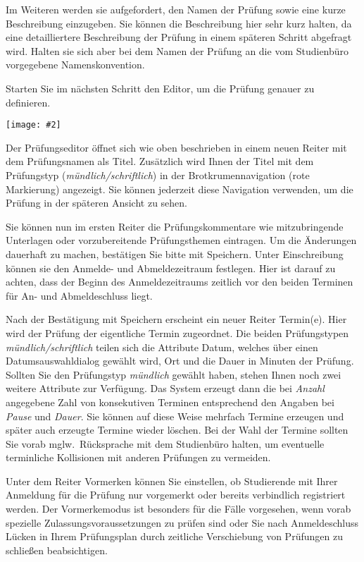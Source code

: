 \documentclass[a4paper,11pt]{article}
\newcommand{\bild}[2]{
    \begin{center}\texttt{[image: \#2]}\end{center}
}
\newcommand{\knopf}[1]{{\sc #1}}
\begin{document}
Im Weiteren werden sie aufgefordert, den Namen der Prüfung sowie eine kurze
Beschreibung einzugeben. Sie können die Beschreibung hier sehr kurz halten, da
eine detailliertere Beschreibung der Prüfung in einem späteren Schritt
abgefragt wird. Halten sie sich aber bei dem Namen der Prüfung an die vom
Studienbüro vorgegebene Namenskonvention. 

Starten Sie im nächsten Schritt den Editor, um die Prüfung genauer zu
definieren.

\bild{1}{Pruefung-Erzeugen-Editor}

Der Prüfungseditor öffnet sich wie oben beschrieben in einem neuen Reiter mit
dem Prüfungsnamen als Titel. Zusätzlich wird Ihnen der Titel mit dem Prüfungstyp ({\em mündlich/schriftlich}) in der \knopf{Brotkrumennavigation} (rote Markierung) angezeigt. Sie können jederzeit diese \knopf{Navigation} verwenden, um die Prüfung in der späteren Ansicht zu sehen. 

Sie können nun im ersten Reiter die Prüfungskommentare wie mitzubringende
Unterlagen oder vorzubereitende Prüfungsthemen eintragen. Um die Änderungen
dauerhaft zu machen, bestätigen Sie bitte mit \knopf{Speichern}. Unter
\knopf{Einschreibung} können sie den Anmelde- und Abmeldezeitraum
festlegen. Hier ist darauf zu achten, dass der Beginn des Anmeldezeitraums
zeitlich vor den beiden Terminen für An- und Abmeldeschluss liegt.

Nach der Bestätigung mit \knopf{Speichern} erscheint ein neuer Reiter
\knopf{Termin(e)}. Hier wird der Prüfung der eigentliche Termin zugeordnet.
Die beiden Prüfungstypen {\em mündlich/schriftlich} teilen sich die Attribute
Datum, welches über einen Datumsauswahldialog gewählt wird, Ort und die Dauer
in Minuten der Prüfung. Sollten Sie den Prüfungstyp {\em mündlich} gewählt
haben, stehen Ihnen noch zwei weitere Attribute zur Verfügung. Das System
erzeugt dann die bei {\em Anzahl} angegebene Zahl von konsekutiven Terminen
entsprechend den Angaben bei {\em Pause} und {\em Dauer}.  Sie können auf
diese Weise mehrfach Termine erzeugen und später auch erzeugte Termine wieder
löschen.  Bei der Wahl der Termine sollten Sie vorab mglw.\ Rücksprache mit
dem Studienbüro halten, um eventuelle terminliche Kollisionen mit anderen
Prüfungen zu vermeiden.

Unter dem Reiter \knopf{Vormerken} können Sie einstellen, ob Studierende mit
Ihrer Anmeldung für die Prüfung nur vorgemerkt oder bereits verbindlich
registriert werden.  Der Vormerkemodus ist besonders für die Fälle vorgesehen,
wenn vorab spezielle Zulassungsvoraussetzungen zu prüfen sind oder Sie nach
Anmeldeschluss Lücken in Ihrem Prüfungsplan durch zeitliche Verschiebung von
Prüfungen zu schließen beabsichtigen.  
\end{document}
